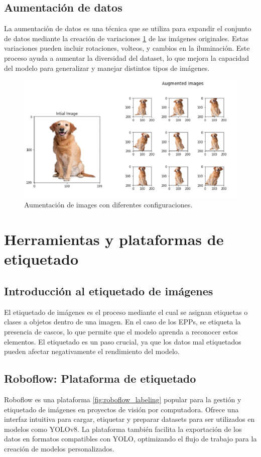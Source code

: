 \subsection{Aumentación de datos}

La aumentación de datos es una técnica que se utiliza para expandir el conjunto de datos mediante la creación de variaciones \ref{fig:data_augmentation} de las imágenes originales. Estas variaciones pueden incluir rotaciones, volteos, y cambios en la iluminación. Este proceso ayuda a aumentar la diversidad del dataset, lo que mejora la capacidad del modelo para generalizar y manejar distintos tipos de imágenes.

\begin{figure}[!ht]
  \centering
  \includegraphics[width=.49\linewidth]{images/data_augmentation.png}
  \caption{Aumentación de images con diferentes configuraciones.}
  \label{fig:data_augmentation}
\end{figure}

\section{Herramientas y plataformas de etiquetado}

\subsection{Introducción al etiquetado de imágenes}

El etiquetado de imágenes es el proceso mediante el cual se asignan etiquetas o clases a objetos dentro de una imagen. En el caso de los EPPs, se etiqueta la presencia de cascos, lo que permite que el modelo aprenda a reconocer estos elementos. El etiquetado es un paso crucial, ya que los datos mal etiquetados pueden afectar negativamente el rendimiento del modelo.

\subsection{Roboflow: Plataforma de etiquetado}

Roboflow es una plataforma  \ref{fig:roboflow_labeling} popular para la gestión y etiquetado de imágenes en proyectos de visión por computadora. Ofrece una interfaz intuitiva para cargar, etiquetar y preparar datasets para ser utilizados en modelos como YOLOv8. La plataforma también facilita la exportación de los datos en formatos compatibles con YOLO, optimizando el flujo de trabajo para la creación de modelos personalizados.

